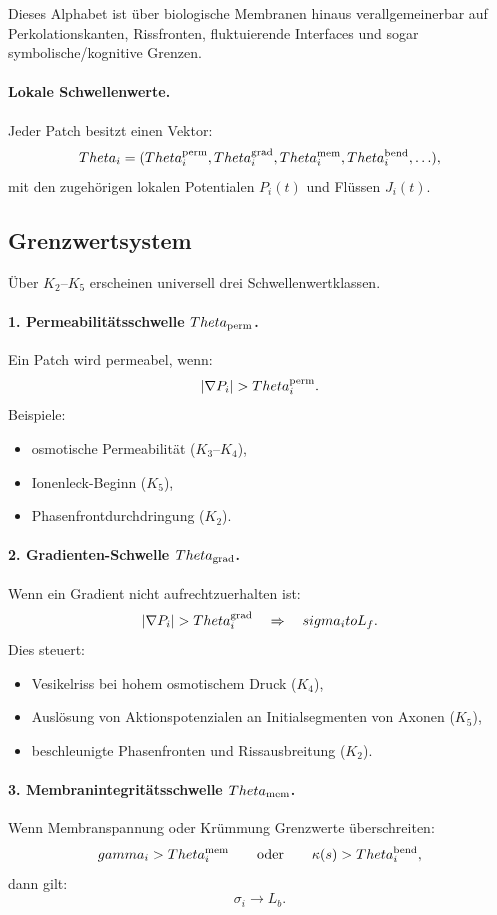 Dieses Alphabet ist über biologische Membranen hinaus verallgemeinerbar auf
Perkolationskanten, Rissfronten, fluktuierende Interfaces und sogar symbolische/kognitive
Grenzen.

\paragraph{Lokale Schwellenwerte.}
Jeder Patch besitzt einen Vektor:
\[
  \Theta_i = (\Theta^{\rm perm}_i, \Theta^{\rm grad}_i, \Theta^{\rm mem}_i,
              \Theta^{\rm bend}_i, \ldots ),
\]
mit den zugehörigen lokalen Potentialen \(P_i(t)\) und Flüssen \(J_i(t)\).

\subsection{Grenzwertsystem}

Über \(K_2\)--\(K_5\) erscheinen universell drei Schwellenwertklassen.

\paragraph{1. Permeabilitätsschwelle \(\Theta_{\rm perm}\).}
Ein Patch wird permeabel, wenn:
\[
  |\nabla P_i| > \Theta^{\rm perm}_i.
\]
Beispiele:
\begin{itemize}
    \item osmotische Permeabilität (\(K_3\)--\(K_4\)),
    \item Ionenleck-Beginn (\(K_5\)),
    \item Phasenfrontdurchdringung (\(K_2\)).
\end{itemize}

\paragraph{2. Gradienten-Schwelle \(\Theta_{\rm grad}\).}
Wenn ein Gradient nicht aufrechtzuerhalten ist:
\[
  |\nabla P_i| > \Theta^{\rm grad}_i
  \quad\Rightarrow\quad \sigma_i \to L_f.
\]
Dies steuert:
\begin{itemize}
    \item Vesikelriss bei hohem osmotischem Druck (\(K_4\)),
    \item Auslösung von Aktionspotenzialen an Initialsegmenten von Axonen (\(K_5\)),
    \item beschleunigte Phasenfronten und Rissausbreitung (\(K_2\)).
\end{itemize}

\paragraph{3. Membranintegritätsschwelle \(\Theta_{\rm mem}\).}
Wenn Membranspannung oder Krümmung Grenzwerte überschreiten:
\[
  \gamma_i > \Theta^{\rm mem}_i
  \qquad\text{oder}\qquad
  \kappa(s) > \Theta^{\rm bend}_i,
\]
dann gilt:
\[
  \sigma_i \to L_b.
\]

